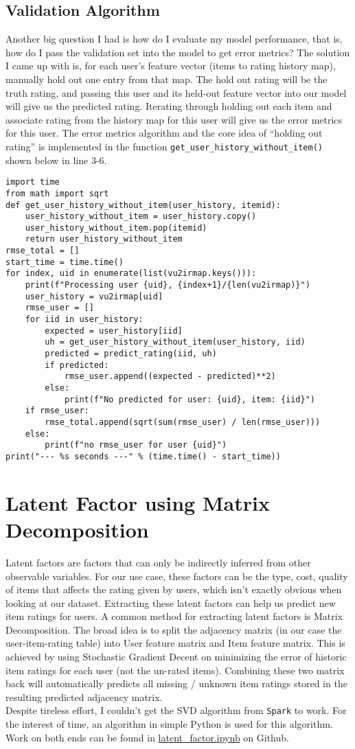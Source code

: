 \documentclass{scrartcl}
\begin{document}
\subsection{Validation Algorithm}
\label{sec:va}
Another big question I had is how do I evaluate my model performance, that is, how do I pass the validation set into the model to get error metrics? The solution I came up with is, for each user's feature vector (items to rating history map), manually hold out one entry from that map. The hold out rating will be the truth rating, and passing this user and its held-out feature vector into our model will give us the predicted rating. Iterating through holding out each item and associate rating from the history map for this user will give us the error metrics for this user. The error metrics algorithm and the core idea of ``holding out rating'' is implemented in the function \texttt{get\_user\_history\_without\_item()} shown below in line 3-6.
\begin{lstlisting}
import time
from math import sqrt
def get_user_history_without_item(user_history, itemid):
    user_history_without_item = user_history.copy()
    user_history_without_item.pop(itemid)
    return user_history_without_item
rmse_total = []
start_time = time.time()
for index, uid in enumerate(list(vu2irmap.keys())):
    print(f"Processing user {uid}, {index+1}/{len(vu2irmap)}")
    user_history = vu2irmap[uid]
    rmse_user = []
    for iid in user_history:
        expected = user_history[iid]
        uh = get_user_history_without_item(user_history, iid)
        predicted = predict_rating(iid, uh)
        if predicted:
            rmse_user.append((expected - predicted)**2)
        else:
            print(f"No predicted for user: {uid}, item: {iid}")
    if rmse_user:
        rmse_total.append(sqrt(sum(rmse_user) / len(rmse_user)))
    else:
        print(f"no rmse_user for user {uid}")
print("--- %s seconds ---" % (time.time() - start_time))
\end{lstlisting}
\section{Latent Factor using Matrix Decomposition}
Latent factors are factors that can only be indirectly inferred from other observable variables. For our use case, these factors can be the type, cost, quality of items that affects the rating given by users, which isn't exactly obvious when looking at our dataset. Extracting these latent factors can help us predict new item ratings for users. A common method for extracting latent factors is Matrix Decomposition. The broad idea is to split the adjacency matrix (in our case the user-item-rating table) into User feature matrix and Item feature matrix. This is achieved by using Stochastic Gradient Decent on minimizing the error of historic item ratings for each user (not the un-rated items). Combining these two matrix back will automatically predicts all missing / unknown item ratings stored in the resulting predicted adjacency matrix. \\
Despite tireless effort, I couldn't get the SVD algorithm from \texttt{Spark} to work. For the interest of time, an algorithm in simple Python is used for this algorithm. Work on both ends can be found in \href{}{latent\_factor.ipynb} on Github.
\end{document}
